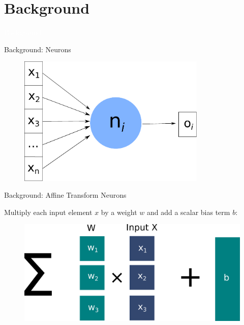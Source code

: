 \documentclass[xcolor=dvipsnames]{beamer}
\begin{document}
\section{Background}

{
\begin{frame}
    \centering
    \textcolor{white}{\LARGE Background}
\end{frame}
}

\begin{frame}{Background: Neurons}

\begin{figure}
    \centering
    \includegraphics[width=0.8\textwidth]{images/neuron.pdf}
\end{figure}

\end{frame}


\begin{frame}{Background: Affine Transform Neurons}

Multiply each input element $x$ by a weight $w$ and add a scalar bias term $b$:

\begin{figure}
    \centering
    \includegraphics[width=0.8\linewidth]{images/affine_transform.pdf}
\end{figure}

\end{frame}
\end{document}
